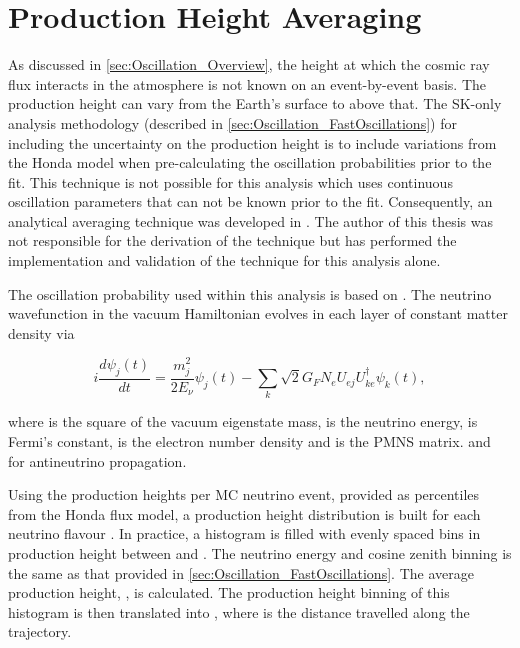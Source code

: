 \clearpage

\section{Production Height Averaging}
\label{sec:Oscillation_ProdHAvergaing}

As discussed in \autoref{sec:Oscillation_Overview}, the height at which the cosmic ray flux interacts in the atmosphere is not known on an event-by-event basis. The production height can vary from the Earth's surface to  above that. The SK-only analysis methodology (described in \autoref{sec:Oscillation_FastOscillations}) for including the uncertainty on the production height is to include variations from the Honda model when pre-calculating the oscillation probabilities prior to the fit. This technique is not possible for this analysis which uses continuous oscillation parameters that can not be known prior to the fit. Consequently, an analytical averaging technique was developed in \cite{t2k_tn_425}. The author of this thesis was not responsible for the derivation of the technique but has performed the implementation and validation of the technique for this analysis alone.

The oscillation probability used within this analysis is based on \cite{Barger:1980tf}. The neutrino wavefunction in the vacuum Hamiltonian evolves in each layer of constant matter density via

\begin{equation}
  i \frac{d\psi_{j}(t)}{dt} = \frac{m_{j}^{2}}{2E_{\nu}} \psi_{j}(t) - \sum_{k} \sqrt{2} G_{F} N_{e} U_{ej} U_{ke}^{\dagger} \psi_{k}(t),
\end{equation}

where  is the square of the  vacuum eigenstate mass,  is the neutrino energy,  is Fermi's constant,  is the electron number density and  is the PMNS matrix.  and  for antineutrino propagation.

Using the  production heights per MC neutrino event, provided as  percentiles from the Honda flux model, a production height distribution  is built for each neutrino flavour . In practice, a histogram is filled with  evenly spaced bins in production height  between  and . The neutrino energy and cosine zenith binning is the same as that provided in \autoref{sec:Oscillation_FastOscillations}. The average production height, , is calculated. The production height binning of this histogram is then translated into , where  is the distance travelled along the trajectory.

